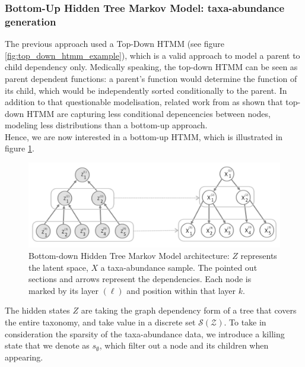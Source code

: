 \subsubsection{Bottom-Up Hidden Tree Markov Model: taxa-abundance generation}

The previous approach used a Top-Down HTMM (see figure \ref{fig:top_down_htmm_example}), which is a valid approach to model a parent to child dependency only.
Medically speaking, the top-down HTMM can be seen as parent dependent functions: a parent's function would determine the function of its child, which would be independently sorted conditionally to the parent.
In addition to that questionable modelisation, related work from \cite{bottom_up_superiority_hidden_tree_markov_models} as shown that top-down HTMM are capturing
less conditional depencencies between nodes, modeling less distributions than a bottom-up approach. \\

Hence, we are now interested in a bottom-up HTMM, which is illustrated in figure \ref{fig:bottom_up_htmm_example}.

\begin{figure}[H]
    \centering
    \includegraphics[scale=.4]{images/bottom_up_hidden_markov_tree_example}
    \caption{Bottom-down Hidden Tree Markov Model architecture: $Z$ represents the latent space, $X$ a taxa-abundance sample.
    The pointed out sections and arrows represent the dependencies.
    Each node is marked by its layer $(\ell)$ and position within that layer $k$.}
    \label{fig:bottom_up_htmm_example}
\end{figure}

\newcommand{\killingstate}{s_{\emptyset}}

The hidden states $Z$ are taking the graph dependency form of a tree that covers the entire taxonomy, and take value in a discrete set $\mathcal{S(Z)}$.
To take in consideration the sparsity of the taxa-abundance data, we introduce a killing state that we denote as $\killingstate$, which filter out a node and its children when appearing. \\

